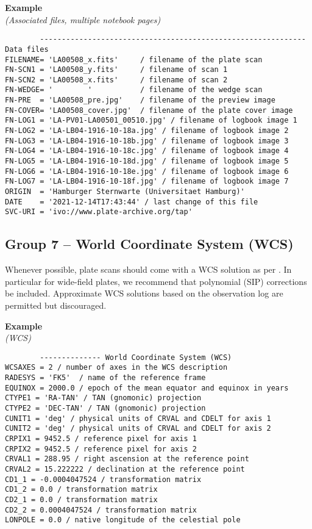 \documentclass[11pt]{ivoa}
\newenvironment{fitsexample}[1]
{\bigskip\noindent\textbf{Example}\\\textit{(#1)\smallskip}}
{\medskip}
\begin{document}
\begin{fitsexample}{Associated files, multiple notebook pages}
\begin{lstlisting}
        ------------------------------------------------------------- Data files
FILENAME= 'LA00508_x.fits'     / filename of the plate scan
FN-SCN1 = 'LA00508_y.fits'     / filename of scan 1
FN-SCN2 = 'LA00508_x.fits'     / filename of scan 2
FN-WEDGE= '        '           / filename of the wedge scan
FN-PRE  = 'LA00508_pre.jpg'    / filename of the preview image
FN-COVER= 'LA00508_cover.jpg'  / filename of the plate cover image
FN-LOG1 = 'LA-PV01-LA00501_00510.jpg' / filename of logbook image 1
FN-LOG2 = 'LA-LB04-1916-10-18a.jpg' / filename of logbook image 2
FN-LOG3 = 'LA-LB04-1916-10-18b.jpg' / filename of logbook image 3
FN-LOG4 = 'LA-LB04-1916-10-18c.jpg' / filename of logbook image 4
FN-LOG5 = 'LA-LB04-1916-10-18d.jpg' / filename of logbook image 5
FN-LOG6 = 'LA-LB04-1916-10-18e.jpg' / filename of logbook image 6
FN-LOG7 = 'LA-LB04-1916-10-18f.jpg' / filename of logbook image 7
ORIGIN  = 'Hamburger Sternwarte (Universitaet Hamburg)'
DATE    = '2021-12-14T17:43:44' / last change of this file
SVC-URI = 'ivo://www.plate-archive.org/tap'
\end{lstlisting}
\end{fitsexample}

\subsection{Group 7 – World Coordinate System (WCS)}

Whenever possible, plate scans should come with a WCS solution as per
\citet{2002A&A...395.1077C}.  In particular for wide-field plates, we
recommend that polynomial (SIP) corrections be included.  Approximate
WCS solutions based on the observation log are permitted but
discouraged.

\begin{fitsexample}{WCS}
\begin{lstlisting}
        -------------- World Coordinate System (WCS)
WCSAXES = 2 / number of axes in the WCS description
RADESYS = 'FK5'  / name of the reference frame
EQUINOX = 2000.0 / epoch of the mean equator and equinox in years
CTYPE1 = 'RA-TAN' / TAN (gnomonic) projection
CTYPE2 = 'DEC-TAN' / TAN (gnomonic) projection
CUNIT1 = 'deg' / physical units of CRVAL and CDELT for axis 1
CUNIT2 = 'deg' / physical units of CRVAL and CDELT for axis 2
CRPIX1 = 9452.5 / reference pixel for axis 1
CRPIX2 = 9452.5 / reference pixel for axis 2
CRVAL1 = 288.95 / right ascension at the reference point
CRVAL2 = 15.222222 / declination at the reference point
CD1_1 = -0.0004047524 / transformation matrix
CD1_2 = 0.0 / transformation matrix
CD2_1 = 0.0 / transformation matrix
CD2_2 = 0.0004047524 / transformation matrix
LONPOLE = 0.0 / native longitude of the celestial pole
\end{lstlisting}
\end{fitsexample}
\end{document}
